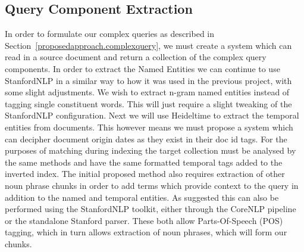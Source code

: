 \documentclass{mprop}
\begin{document}

\subsection{Query Component Extraction}
In order to formulate our complex queries as described in Section~\ref{proposedapproach.complexquery}, we must create a system which can read in a source document and return a collection of the complex query components. 
In order to extract the Named Entities we can continue to use StanfordNLP in a similar way to how it was used in the previous project, with some slight adjustments. 
We wish to extract n-gram named entities instead of tagging single constituent words. 
This will just require a slight tweaking of the StanfordNLP configuration. 
Next we will use Heideltime to extract the temporal entities from documents. 
This however means we must propose a system which can decipher document origin dates as they exist in their doc id tags. 
For the purposes of matching during indexing the target collection must be analysed by the same methods and have the same formatted temporal tags added to the inverted index. 
The initial proposed method also requires extraction of other noun phrase chunks in order to add terms which provide context to the query in addition to the named and temporal entities. 
As suggested this can also be performed using the StanfordNLP toolkit, either through the CoreNLP pipeline or the standalone Stanford parser. 
These both allow Parts-Of-Speech (POS) tagging, which in turn allows extraction of noun phrases, which will form our chunks.
\end{document}
